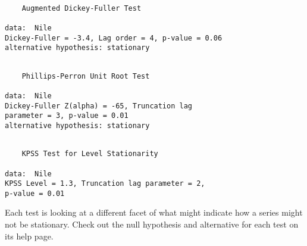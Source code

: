 \begin{knitrout}
\color{fgcolor}\begin{kframe}
\begin{alltt}
\hlstd{> }
\hlstd{> }
\end{alltt}


{\ttfamily\noindent\itshape\color{messagecolor}{Loading required package: zoo}}

{\ttfamily\noindent\itshape\color{messagecolor}{\\Attaching package: 'zoo'}}

{\ttfamily\noindent\itshape\color{messagecolor}{The following objects are masked from 'package:base':

\ \ \ \ as.Date, as.Date.numeric}}

{\ttfamily\noindent\itshape\color{messagecolor}{Loading required package: timeDate}}

{\ttfamily\noindent\itshape\color{messagecolor}{This is forecast 7.1 }}\begin{alltt}
\hlstd{> }
\end{alltt}
\begin{verbatim}

	Augmented Dickey-Fuller Test

data:  Nile
Dickey-Fuller = -3.4, Lag order = 4, p-value = 0.06
alternative hypothesis: stationary
\end{verbatim}
\begin{alltt}
\hlstd{> }
\end{alltt}


{\ttfamily\noindent\color{warningcolor}{Warning in pp.test(Nile): p-value smaller than printed p-value}}\begin{verbatim}

	Phillips-Perron Unit Root Test

data:  Nile
Dickey-Fuller Z(alpha) = -65, Truncation lag
parameter = 3, p-value = 0.01
alternative hypothesis: stationary
\end{verbatim}
\begin{alltt}
\hlstd{> }
\end{alltt}


{\ttfamily\noindent\color{warningcolor}{Warning in kpss.test(Nile): p-value smaller than printed p-value}}\begin{verbatim}

	KPSS Test for Level Stationarity

data:  Nile
KPSS Level = 1.3, Truncation lag parameter = 2,
p-value = 0.01
\end{verbatim}
\end{kframe}
\end{knitrout}
Each test is looking at a different facet of what might indicate how a series might not be stationary. Check out the null hypothesis and alternative for each test on its help page. 
 
